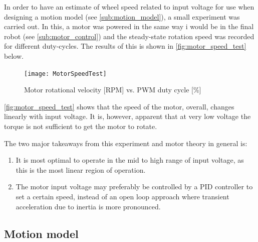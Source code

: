 \documentclass[Main]{subfiles}
\begin{document}
		In order to have an estimate of wheel speed related to input voltage for use when designing a motion model (see \autoref{sub:motion_model}), a small experiment was carried out.
		In this, a motor was powered in the same way i would be in the final robot (see \autoref{sub:motor_control}) and the steady-state rotation speed was recorded for different duty-cycles.
		The results of this is shown in \autoref{fig:motor_speed_test} below.

		\begin{figure}[H]
			\centering
			\texttt{[image: MotorSpeedTest]}
			\caption{Motor rotational velocity [RPM] vs. PWM duty cycle [\%]}
			\label{fig:motor_speed_test}
		\end{figure}

		\autoref{fig:motor_speed_test} shows that the speed of the motor, overall, changes linearly with input voltage.
		It is, however, apparent that at very low voltage the torque is not sufficient to get the motor to rotate.

		The two major takeaways from this experiment and motor theory in general is:
		\begin{enumerate}
			\item
			It is most optimal to operate in the mid to high range of input voltage, as this is the most linear region of operation.

			\item
			The motor input voltage may preferably be controlled by a PID controller to set a certain speed, instead of an open loop approach where transient acceleration due to inertia is more pronounced.
		\end{enumerate}


	\subsection{Motion model} %
	\label{sub:motion_model}
\end{document}
